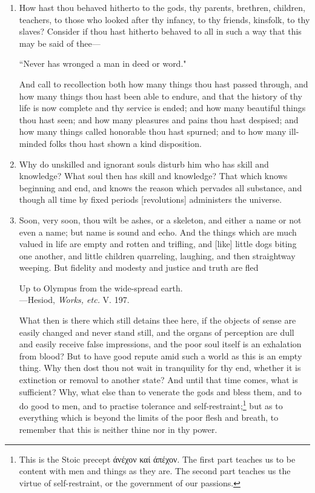 \begin{enumerate}
\item How hast thou behaved hitherto to the gods, thy parents, brethren, children, teachers, to those who looked after thy infancy, to thy friends, kinsfolk, to thy slaves? Consider if thou hast hitherto behaved to all in such a way that this may be said of thee—
\begin{displayquote}
	``Never has wronged a man in deed or word."
\end{displayquote}
And call to recollection both how many things thou hast passed through, and how many things thou hast been able to endure, and that the history of thy life is now complete and thy service is ended; and how many beautiful things thou hast seen; and how many pleasures and pains thou hast despised; and how many things called honorable thou hast spurned; and to how many ill-minded folks thou hast shown a kind disposition.

\item Why do unskilled and ignorant souls disturb him who has skill and knowledge? What soul then has skill and knowledge? That which knows beginning and end, and knows the reason which pervades all substance, and though all time by fixed periods [{\clarify revolutions}] administers the universe.

\item Soon, very soon, thou wilt be ashes, or a skeleton, and either a name or not even a name; but name is sound and echo. And the things which are much valued in life are empty and rotten and trifling, and [{\clarify like}] little dogs biting one another, and little children quarreling, laughing, and then straightway weeping. But fidelity and modesty and justice and truth are fled
\begin{displayquote}
	Up to Olympus from the wide-spread earth.\\
	—Hesiod, \textit{Works, etc.} V. 197.
\end{displayquote}
What then is there which still detains thee here, if the objects of sense are easily changed and never stand still, and the organs of perception are dull and easily receive false impressions, and the poor soul itself is an exhalation from blood? But to have good repute amid such a world as this is an empty thing. Why then dost thou not wait in tranquility for thy end, whether it is extinction or removal to another state? And until that time comes, what is sufficient? Why, what else than to venerate the gods and bless them, and to do good to men, and to practise tolerance and self-restraint;\footnote{This is the Stoic precept \textgreek{άνέχον καί άπέχον}. The first part teaches us to be content with men and things as they are. The second part teaches us the virtue of self-restraint, or the government of our passions.} but as to everything which is beyond the limits of the poor flesh and breath, to remember that this is neither thine nor in thy power.


\end{enumerate}
